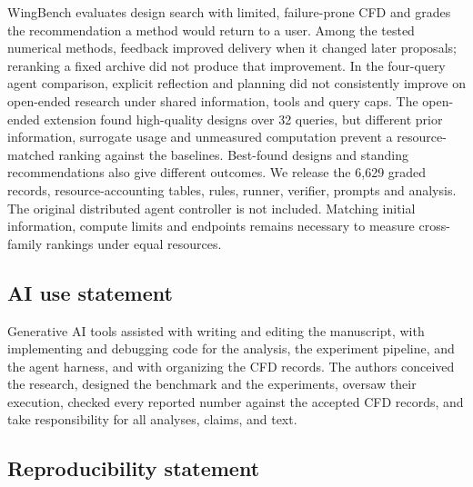\documentclass{article} %
\begin{document}
WingBench evaluates design search with limited, failure-prone CFD and grades
the recommendation a method would return to a user. Among the tested numerical
methods, feedback improved delivery when it changed later proposals; reranking
a fixed archive did not produce that improvement. In the four-query agent
comparison, explicit reflection and planning did not consistently improve on
open-ended research under shared information, tools and query caps. The
open-ended extension found high-quality designs over 32 queries, but different
prior information, surrogate usage and unmeasured computation prevent a
resource-matched ranking against the baselines. Best-found designs and standing
recommendations also give different outcomes. We release the 6{,}629 graded
records, resource-accounting tables, rules, runner, verifier, prompts and
analysis. The original distributed agent controller is not included. Matching
initial information, compute limits and endpoints remains necessary to measure
cross-family rankings under equal resources.

\subsection*{AI use statement}

Generative AI tools assisted with writing and editing the manuscript, with
implementing and debugging code for the analysis, the experiment pipeline, and
the agent harness, and with organizing the CFD records. The authors conceived
the research, designed the benchmark and the experiments, oversaw their
execution, checked every reported number against the accepted CFD records, and
take responsibility for all analyses, claims, and text.

\subsection*{Reproducibility statement}
\end{document}
